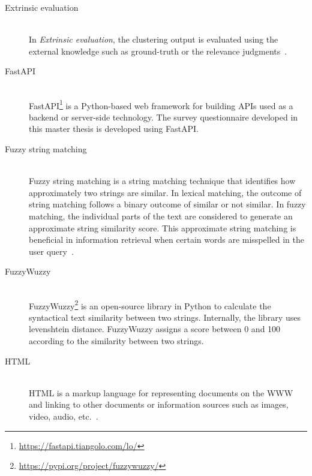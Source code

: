 \begin{description}
		\item[Extrinsic evaluation] \hfill \\ In \emph{Extrinsic evaluation}, the clustering output is evaluated using the external knowledge such as ground-truth or the relevance judgments~\cite{de2012document}. 
		
		
		\item[FastAPI] \hfill \\ FastAPI\footnote{\url{https://fastapi.tiangolo.com/lo/}} is a Python-based web framework for building APIs used as a
	backend or server-side technology. The survey questionnaire developed in this master thesis is
	developed using FastAPI.
	
		\item[Fuzzy string matching] \hfill \\ Fuzzy string matching is a string matching technique that identifies how approximately two strings are similar. In lexical matching, the outcome of string matching follows a binary outcome of similar or not similar. In fuzzy matching, the individual parts of the text are considered to generate an approximate string similarity score. This approximate string matching is beneficial in information retrieval when certain words are misspelled in the user query~\cite{redisWhatFuzzy}.
		
			 \item[FuzzyWuzzy] \hfill \\ FuzzyWuzzy\footnote{\url{https://pypi.org/project/fuzzywuzzy/}} is an open-source library in Python to calculate the syntactical text similarity between two strings. Internally, the library uses levenshtein distance. FuzzyWuzzy assigns a score between 0 and 100 according to the similarity between two strings.
			 
	
		 \item[HTML] \hfill \\
	
	\ac{HTML} is a markup language for representing documents on the \ac{WWW} and linking to other documents or information sources such as images, video, audio, etc.~\cite{html}.
			 

\end{description}

